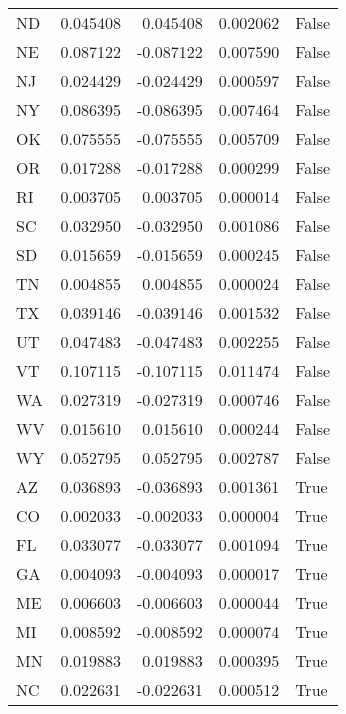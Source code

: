 \begin{table}
\begin{tabular}{lrrrl}
      ND &   0.045408 &  0.045408 &       0.002062 &         False \\
      NE &   0.087122 & -0.087122 &       0.007590 &         False \\
      NJ &   0.024429 & -0.024429 &       0.000597 &         False \\
      NY &   0.086395 & -0.086395 &       0.007464 &         False \\
      OK &   0.075555 & -0.075555 &       0.005709 &         False \\
      OR &   0.017288 & -0.017288 &       0.000299 &         False \\
      RI &   0.003705 &  0.003705 &       0.000014 &         False \\
      SC &   0.032950 & -0.032950 &       0.001086 &         False \\
      SD &   0.015659 & -0.015659 &       0.000245 &         False \\
      TN &   0.004855 &  0.004855 &       0.000024 &         False \\
      TX &   0.039146 & -0.039146 &       0.001532 &         False \\
      UT &   0.047483 & -0.047483 &       0.002255 &         False \\
      VT &   0.107115 & -0.107115 &       0.011474 &         False \\
      WA &   0.027319 & -0.027319 &       0.000746 &         False \\
      WV &   0.015610 &  0.015610 &       0.000244 &         False \\
      WY &   0.052795 &  0.052795 &       0.002787 &         False \\
      AZ &   0.036893 & -0.036893 &       0.001361 &          True \\
      CO &   0.002033 & -0.002033 &       0.000004 &          True \\
      FL &   0.033077 & -0.033077 &       0.001094 &          True \\
      GA &   0.004093 & -0.004093 &       0.000017 &          True \\
      ME &   0.006603 & -0.006603 &       0.000044 &          True \\
      MI &   0.008592 & -0.008592 &       0.000074 &          True \\
      MN &   0.019883 &  0.019883 &       0.000395 &          True \\
      NC &   0.022631 & -0.022631 &       0.000512 &          True \\

\end{tabular}
\end{table}

